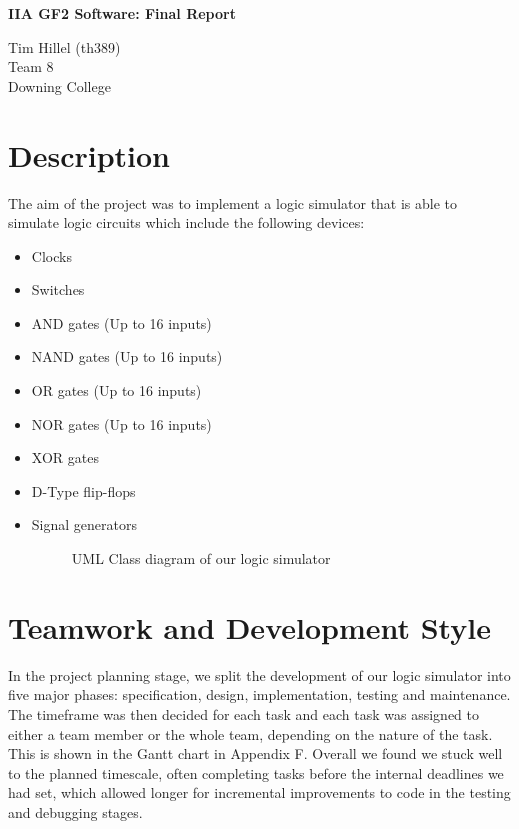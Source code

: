 \documentclass[a4paper,10pt]{article}
\begin{document}
\begin{center}
\Huge \textbf{IIA GF2 Software: Final Report}

\large Tim Hillel (th389) \\ Team 8 \\ Downing College
\end{center}

\tableofcontents
\pagebreak

\section{Description}
The aim of the project was to implement a logic simulator that is able to simulate logic circuits which include the following devices:

\begin{itemize}
\item Clocks
\item Switches
\item AND gates (Up to 16 inputs)
\item NAND gates (Up to 16 inputs)
\item OR gates (Up to 16 inputs)
\item NOR gates (Up to 16 inputs)
\item XOR gates
\item D-Type flip-flops
\item Signal generators


\begin{figure}[h]
 \centering
 \caption{UML Class diagram of our logic simulator}
 \label{fig:uml}
\end{figure}


\end{itemize}
\pagebreak
\section{Teamwork and Development Style}

In the project planning stage, we split the development of our logic simulator into five major phases: specification, design, implementation, testing and maintenance. The timeframe was then decided for each task and each task was assigned to either a team member or the whole team, depending on the nature of the task. This is shown in the Gantt chart in Appendix F. Overall we found we stuck well to the planned timescale, often completing tasks before the internal deadlines we had set, which allowed longer for incremental improvements to code in the testing and debugging stages.
\end{document}
